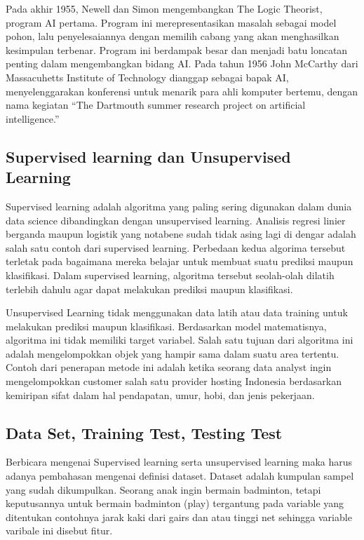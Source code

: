 \documentclass{article}
\begin{document}
\hspace{1cm} Pada akhir 1955, Newell dan Simon mengembangkan  The Logic Theorist, program AI pertama. Program ini merepresentasikan  masalah sebagai model pohon, lalu penyelesaiannya dengan  memilih cabang yang akan menghasilkan kesimpulan terbenar. Program ini berdampak besar dan menjadi batu loncatan penting dalam mengembangkan bidang AI. Pada tahun 1956 John McCarthy dari  Massacuhetts Institute of Technology dianggap sebagai bapak AI, menyelenggarakan konferensi untuk menarik para ahli komputer bertemu, dengan  nama kegiatan “The Dartmouth summer research project on artificial intelligence.” 

\subsection{Supervised learning dan Unsupervised Learning}
\hspace{1cm} Supervised learning adalah algoritma yang paling sering digunakan dalam dunia data science dibandingkan dengan unsupervised learning. Analisis regresi linier berganda maupun logistik yang notabene sudah tidak asing lagi di dengar adalah salah satu contoh dari supervised learning. Perbedaan kedua algorima tersebut terletak pada bagaimana mereka belajar untuk membuat suatu prediksi maupun klasifikasi. Dalam supervised learning, algoritma tersebut seolah-olah dilatih terlebih dahulu agar dapat melakukan prediksi maupun klasifikasi.

\hspace{1cm} Unsupervised Learning tidak menggunakan data latih atau data training untuk melakukan prediksi maupun klasifikasi. Berdasarkan model matematisnya, algoritma ini tidak memiliki target variabel. Salah satu tujuan dari algoritma ini adalah mengelompokkan objek yang hampir sama dalam suatu area tertentu. Contoh dari penerapan metode ini adalah ketika seorang data analyst ingin mengelompokkan customer salah satu provider hosting Indonesia berdasarkan kemiripan sifat dalam hal pendapatan, umur, hobi, dan jenis pekerjaan.

\subsection{Data Set, Training Test, Testing Test}
\hspace{1cm} Berbicara mengenai Supervised learning serta unsupervised learning maka harus adanya pembahasan mengenai definisi dataset. Dataset adalah kumpulan sampel yang sudah dikumpulkan. Seorang anak ingin bermain badminton, tetapi keputusannya untuk bermain badminton (play) tergantung pada variable yang ditentukan contohnya jarak kaki dari gairs dan atau tinggi net sehingga variable varibale ini disebut fitur.
\end{document}
